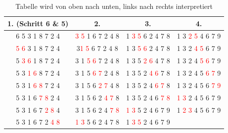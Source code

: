 \documentclass[a4paper]{article}
\begin{document}
    \begin{table}[h]
        \centering
        \begin{tabular}{c|c|c|c}
            \textbf{1. (Schritt 6 \& 5)}    & 
            \textbf{2.}    & 
            \textbf{3.}    &
            \textbf{4.}   \\
            
            \hline
            6 5 3 1 8 7 2 4 & 
            \textcolor{red}{3 5} 1 6 7 2 4 8  &
            1 \textcolor{red}{3 5} 6 2 4 7 8 & 
            1 3 \textcolor{red}{2 5} 4 6 7 9 \\
            
            \textcolor{red}  {5 6} 3 1 8 7 2 4 &
            3\textcolor{red} {1 5} 6 7 2 4 8 &
            1 3 \textcolor{red}{5 6} 2 4 7 8 & 
            1 3 2 \textcolor{red}{4 5} 6 7 9 \\
            
            5 \textcolor{red}{3 6} 1 8 7 2 4 &
            3 1 \textcolor{red}{5 6} 7 2 4 8 &
            1 3 5 \textcolor{red}{2 6} 4 7 8 &
            1 3 2 4 \textcolor{red}{5 6} 7 9 \\

            5 3 \textcolor{red}{1 6} 8 7 2 4 & 
            3 1 5 \textcolor{red}{6 7} 2 4 8 &
            1 3 5 2 \textcolor{red}{4 6} 7 8 &
            1 3 2 4 5 \textcolor{red}{6 7} 9 \\

            5 3 1 \textcolor{red}{6 8} 7 2 4 &
            3 1 5 6 \textcolor{red}{2 7} 4 8 &
            1 3 5 2 4 \textcolor{red}{6 7} 8 &
            1 3 2 4 5 6 \textcolor{red}{7 9} \\

            5 3 1 6 \textcolor{red}{7 8} 2 4 &
            3 1 5 6 2 \textcolor{red}{4 7} 8 &
            1 3 5 2 4 6 \textcolor{red}{7 8} &
            \textcolor{red}{1 3} 2 4 5 6 7 9\\

            5 3 1 6 7  \textcolor{red}{2 8} 4 &
            3 1 5 6 2 4  \textcolor{red}{7 8} &
             \textcolor{red}{1 3} 5 2 4 6 7 9 &
            1  \textcolor{red}{2 3} 4 5 6 7 9 \\

            5 3 1 6 7 2 \textcolor{red}{4 8} & 
          \textcolor{red}{1 3} 5 6 2 4 7 8 &
            1 \textcolor{red}{3 5} 2 4 6 7 9 &
            \\
       
        \end{tabular}
        \caption{Tabelle wird von oben nach unten, links nach rechts interpretiert}
        \label{tab:BubblesortTable}
    \end{table}
\end{document}
